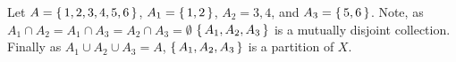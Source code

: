\guard




\begin{exmp}
\label{exmp:easyParitions}
  Let $A=\left\{\, 1,2,3,4,5,6\,\right\}$, $A_1 = \left\{\,1,2\,\right\}$, $A_2={3,4}$, and $A_3=\left\{\,5,6\,\right\}$.
    Note, as $A_1\cap A_2=A_1\cap A_3=A_2\cap A_3=\emptyset$ $\left\{\,A_1,A_2,A_3\,\right\}$ is a mutually disjoint collection.
    Finally as $A_1\cup A_2\cup A_3 = A$, $\left\{\,A_1,A_2,A_3\,\right\}$ is a partition of $X$.
\end{exmp}
